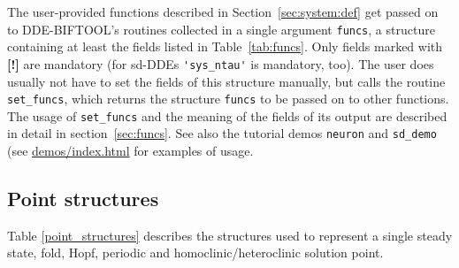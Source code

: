 \documentclass[10pt]{scrartcl}
\newcommand{\DDEBIFCODE}{\textsc{DDE-BIFTOOL}}
\newcommand{\demobase}{\url{demos/index.html}}
\newcommand{\blist}[1]{\mbox{\lstinline!#1!}}
\begin{document}
The user-provided functions described in Section~\ref{sec:system:def}
get passed on to \DDEBIFCODE's routines collected in a single argument
\blist{funcs}, a structure containing at least the fields listed in
Table~\ref{tab:funcs}. Only fields marked with \textbf{[!]} are
mandatory (for sd-DDEs \blist{'sys_ntau'} is mandatory, too). The user
does usually not have to set the fields of this structure manually,
but calls the routine \blist{set_funcs}, which returns the structure
\blist{funcs} to be passed on to other functions. The usage of
\blist{set_funcs} and the meaning of the fields of its output are
described in detail in section~\ref{sec:funcs}. See also the tutorial
demos \texttt{neuron} and \texttt{sd\_demo} (see
\demobase{} for examples of usage.

\subsection{Point structures}\label{sec:point:struct}

Table \ref{point_structures} describes the structures used to
represent a single steady state, fold, Hopf, 
periodic and 
homoclinic/heteroclinic solution point.
\end{document}
